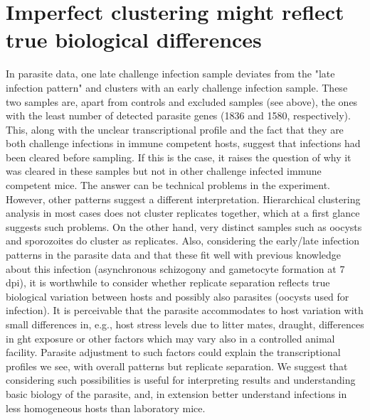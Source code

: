 \documentclass{bmcart}
\begin{document}
\section*{Imperfect clustering might reflect true biological differences}
In parasite data, one late challenge infection sample deviates from the "late infection pattern" and clusters with an early challenge infection sample. These two samples are, apart from controls and excluded samples (see above), the ones with the least number of detected parasite genes (1836 and 1580, respectively). This, along with the unclear transcriptional profile and the fact that they are both challenge infections in immune competent hosts, suggest that infections had been cleared before sampling. If this is the case, it raises the question of why it was cleared in these samples but not in other challenge infected immune competent mice. The answer can be technical problems in the experiment. However, other patterns suggest a different interpretation. Hierarchical clustering analysis in most cases does not cluster replicates together, which at a first glance suggests such problems. On the other hand, very distinct samples such as oocysts and sporozoites do cluster as replicates. Also, considering the early/late infection patterns in the parasite data and that these fit well with previous knowledge about this infection (asynchronous schizogony and gametocyte formation at 7 dpi), it is worthwhile to consider whether replicate separation reflects true biological variation between hosts and possibly also parasites (oocysts used for infection). It is perceivable that the parasite accommodates to host variation with small differences in, e.g., host stress levels due to litter mates, draught, differences in ght exposure or other factors which may vary also in a controlled animal facility. Parasite adjustment to such factors could explain the transcriptional profiles we see, with overall patterns but replicate separation. We suggest that considering such possibilities is useful for interpreting results and understanding basic biology of the parasite, and, in extension better understand infections in less homogeneous hosts than laboratory mice. 
\end{document}
